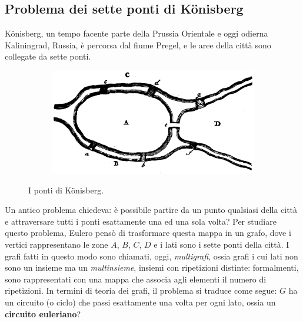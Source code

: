 \subsection{Problema dei sette ponti di K\"onisberg}
K\"onisberg, un tempo facente parte della Prussia Orientale e oggi odierna
Kaliningrad, Russia, è percorsa dal fiume Pregel, e le aree della città
sono collegate da sette ponti.
\begin{figure}[h]
	\centering
	\begin{subfigure}[b]{0.45\textwidth}
		\centering
		\includegraphics[width=\textwidth]{images/konigsberg.png}
	\end{subfigure}
	\begin{subfigure}[b]{0.45\textwidth}
		\centering
	\end{subfigure}
	\caption{I ponti di K\"onisberg.}
	\label{fig:ponti_konigsberg}
\end{figure}

Un antico problema chiedeva: è possibile partire da un punto qualsiasi della
città e attraversare tutti i ponti esattamente una ed una sola volta?
Per studiare questo problema, Eulero pensò di trasformare questa mappa in un
grafo, dove i vertici rappresentano le zone $A$, $B$, $C$, $D$ e i lati
sono i sette ponti della città. I grafi fatti in questo modo sono chiamati, oggi,
\textit{multigrafi}, ossia grafi i cui lati non sono un insieme ma un \textit{multinsieme},
insiemi con ripetizioni distinte: formalmenti, sono rappresentati con una mappa
che associa agli elementi il numero di ripetizioni. In termini di teoria dei
grafi, il problema si traduce come segue: $G$ ha un circuito (o ciclo)  che
passi esattamente una volta per ogni lato, ossia un \textbf{circuito euleriano}?

